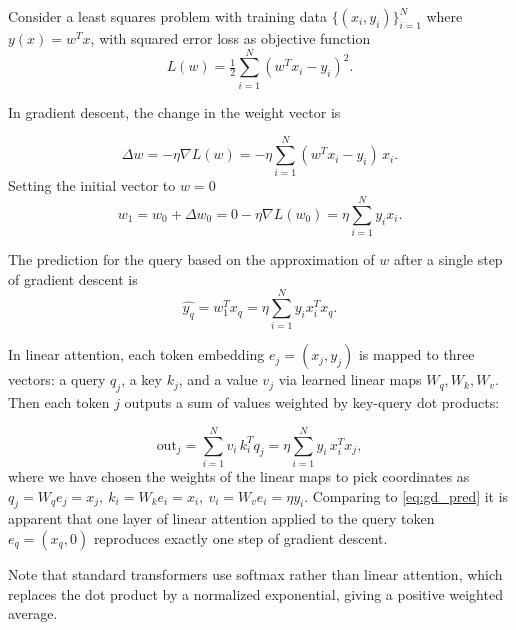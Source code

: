 Consider a least squares problem with training data $\{(x_i, y_i)\}_{i=1}^N$ where $y(x)=w^Tx$, with squared error loss as objective function
\begin{equation}
L(w)=\tfrac12\sum_{i=1}^N (w^Tx_i-y_i)^2.
\end{equation}

In gradient descent, the change in the weight vector is

\begin{equation}
    \Delta w = -\eta \nabla L(w)=-\eta \sum_{i=1}^N (w^Tx_i-y_i)\,x_i.
\end{equation}
Setting the initial vector to $w=0$
\begin{equation}
    w_1=w_0 + \Delta w_0= 0-\eta \nabla L(w_0)= \eta\sum_{i=1}^N y_i x_i.
\end{equation}




The prediction for the query based on the approximation of $w$ after a single step of gradient descent is
\begin{equation}
    \hat{y_q} = w_1^Tx_q = \eta \sum_{i=1}^{N} y_i x_i^Tx_q.
    \label{eq:gd_pred}
\end{equation}

In linear attention, each token embedding $e_j=(x_j, y_j)$ is mapped to three vectors: a query $q_j$, a key $k_j$, and a value $v_j$ via learned linear maps $W_q, W_k, W_v$. Then each token $j$ outputs a sum of values weighted by key-query dot products:
\vspace{-2em}

\begin{equation}
    \text{out}_j=\sum_{i=1}^N v_i\,k_i^T q_j= \eta \sum_{i=1}^N y_i\,x_i^T x_j, 
\end{equation} where we have chosen the weights of the linear maps to pick coordinates as $ q_j=W_q e_j =x_j,\ k_i=W_k e_i=x_i,\ v_i=W_v e_i = \eta y_i$. Comparing to \eqref{eq:gd_pred} it is apparent that one layer of linear attention applied to the query token $e_q=(x_q, 0)$ reproduces exactly one step of gradient descent.

Note that standard transformers use softmax rather than linear attention, which replaces the dot product by a normalized exponential, giving a positive weighted average.





